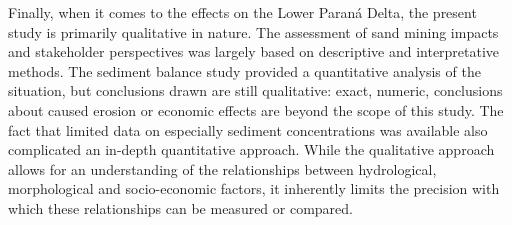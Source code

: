 Finally, when it comes to the effects on the Lower Paraná Delta, the present study is primarily qualitative in nature. The assessment of sand mining impacts and stakeholder perspectives was largely based on descriptive and interpretative methods. The sediment balance study provided a quantitative analysis of the situation, but conclusions drawn are still qualitative: exact, numeric, conclusions about caused erosion or economic effects are beyond the scope of this study. The fact that limited data on especially sediment concentrations was available also complicated an in-depth quantitative approach. While the qualitative approach allows for an understanding of the relationships between hydrological, morphological and socio-economic factors, it inherently limits the precision with which these relationships can be measured or compared.




